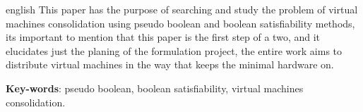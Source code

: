 \begin{resumo}[Abstract]
 \begin{otherlanguage*}{english}
   This paper has the purpose of searching and study the problem of virtual machines consolidation using pseudo boolean and boolean satisfiability methods, its important to mention that this paper is the first step of a two, and it elucidates just the planing of the formulation project, the entire work aims to distribute virtual machines in the way that keeps the minimal hardware on.
   \vspace{\onelineskip}

 
   \noindent 
   \textbf{Key-words}: pseudo boolean, boolean satisfiability, virtual machines consolidation.
 \end{otherlanguage*}
\end{resumo}

